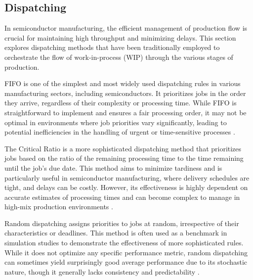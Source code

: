 \subsection{Dispatching}

In semiconductor manufacturing, the efficient management of production flow is crucial for maintaining high throughput and minimizing delays. This section explores dispatching methods that have been traditionally employed to orchestrate the flow of work-in-process (WIP) through the various stages of production. 

FIFO is one of the simplest and most widely used dispatching rules in various manufacturing sectors, including semiconductors. It prioritizes jobs in the order they arrive, regardless of their complexity or processing time. While FIFO is straightforward to implement and ensures a fair processing order, it may not be optimal in environments where job priorities vary significantly, leading to potential inefficiencies in the handling of urgent or time-sensitive processes \cite{kumar1993}.

The Critical Ratio is a more sophisticated dispatching method that prioritizes jobs based on the ratio of the remaining processing time to the time remaining until the job's due date. This method aims to minimize tardiness and is particularly useful in semiconductor manufacturing, where delivery schedules are tight, and delays can be costly. However, its effectiveness is highly dependent on accurate estimates of processing times and can become complex to manage in high-mix production environments \cite{baker1974}. 

Random dispatching assigns priorities to jobs at random, irrespective of their characteristics or deadlines. This method is often used as a benchmark in simulation studies to demonstrate the effectiveness of more sophisticated rules. While it does not optimize any specific performance metric, random dispatching can sometimes yield surprisingly good average performance due to its stochastic nature, though it generally lacks consistency and predictability \cite{blackstone1982}. 

